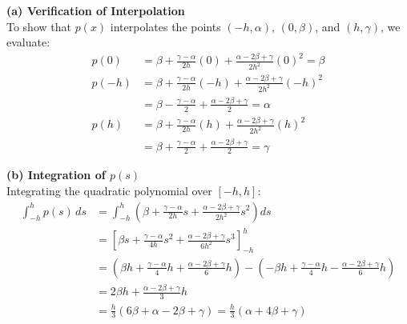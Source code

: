 \documentclass[reqno, answers]{exam}
\begin{document}
\begin{enumerate}
\begin{solution}
              \noindent \textbf{(a) Verification of Interpolation} \\
              To show that $p(x)$ interpolates the points $(-h, \alpha)$, $(0, \beta)$, and $(h, \gamma)$, we evaluate:
              \begin{align*}
                  p(0)  & = \beta + \frac{\gamma - \alpha}{2h}(0) + \frac{\alpha - 2\beta + \gamma}{2h^2}(0)^2 = \beta \\
                  p(-h) & = \beta + \frac{\gamma - \alpha}{2h}(-h) + \frac{\alpha - 2\beta + \gamma}{2h^2}(-h)^2       \\
                        & = \beta - \frac{\gamma - \alpha}{2} + \frac{\alpha - 2\beta + \gamma}{2} = \alpha            \\
                  p(h)  & = \beta + \frac{\gamma - \alpha}{2h}(h) + \frac{\alpha - 2\beta + \gamma}{2h^2}(h)^2         \\
                        & = \beta + \frac{\gamma - \alpha}{2} + \frac{\alpha - 2\beta + \gamma}{2} = \gamma
              \end{align*}

              \vspace{1em}
              \noindent \textbf{(b) Integration of $p(s)$} \\
              Integrating the quadratic polynomial over $[-h, h]$:
              \begin{align*}
                  \int_{-h}^{h} p(s) \, ds & = \int_{-h}^{h} \left( \beta + \frac{\gamma - \alpha}{2h}s + \frac{\alpha - 2\beta + \gamma}{2h^2}s^2 \right) ds                                                                         \\
                                           & = \left[ \beta s + \frac{\gamma - \alpha}{4h}s^2 + \frac{\alpha - 2\beta + \gamma}{6h^2}s^3 \right]_{-h}^{h}                                                                             \\
                                           & = \left( \beta h + \frac{\gamma - \alpha}{4}h + \frac{\alpha - 2\beta + \gamma}{6}h \right) - \left( -\beta h + \frac{\gamma - \alpha}{4}h - \frac{\alpha - 2\beta + \gamma}{6}h \right) \\
                                           & = 2\beta h + \frac{\alpha - 2\beta + \gamma}{3}h                                                                                                                                         \\
                                           & = \frac{h}{3}(6\beta + \alpha - 2\beta + \gamma) = \frac{h}{3}(\alpha + 4\beta + \gamma)
              \end{align*}


\end{solution}
\end{enumerate}
\end{document}

